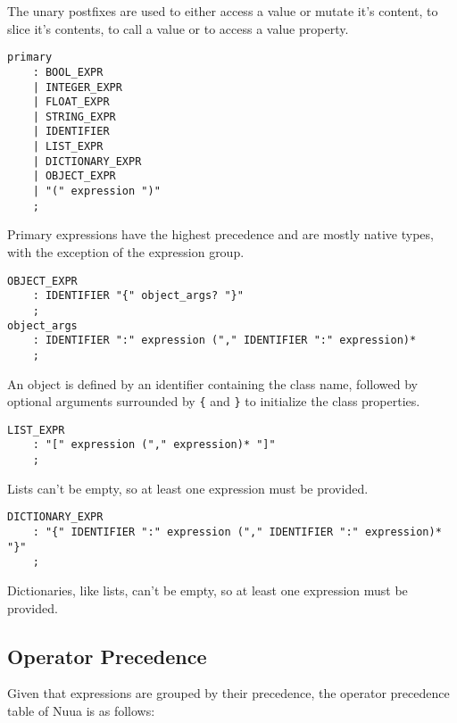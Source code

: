 The unary postfixes are used to either access a value or mutate it's content, to slice it's contents, to call a value or to access a value property.

\begin{lstlisting}
primary
    : BOOL_EXPR
    | INTEGER_EXPR
    | FLOAT_EXPR
    | STRING_EXPR
    | IDENTIFIER
    | LIST_EXPR
    | DICTIONARY_EXPR
    | OBJECT_EXPR
    | "(" expression ")"
    ;
\end{lstlisting}

Primary expressions have the highest precedence and are mostly native types, with the exception of the expression group.

\begin{lstlisting}
OBJECT_EXPR
    : IDENTIFIER "{" object_args? "}"
    ;
object_args
    : IDENTIFIER ":" expression ("," IDENTIFIER ":" expression)*
    ;
\end{lstlisting}

An object is defined by an identifier containing the class name, followed by optional arguments surrounded by \texttt{\{} and \texttt{\}} to
initialize the class properties.

\begin{lstlisting}
LIST_EXPR
    : "[" expression ("," expression)* "]"
    ;
\end{lstlisting}

Lists can't be empty, so at least one expression must be provided.

\begin{lstlisting}
DICTIONARY_EXPR
    : "{" IDENTIFIER ":" expression ("," IDENTIFIER ":" expression)* "}"
    ;
\end{lstlisting}

Dictionaries, like lists, can't be empty, so at least one expression must be provided.

\subsection{Operator Precedence}

Given that expressions are grouped by their precedence, the operator precedence table of Nuua is as follows:

